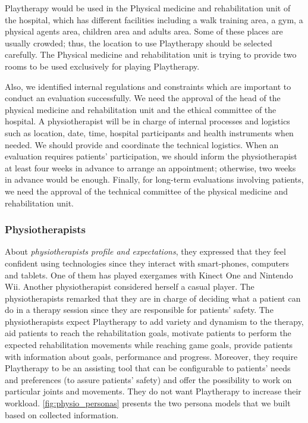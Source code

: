 Playtherapy would be used in the Physical medicine and rehabilitation unit of the hospital, which has different facilities including a walk training area, a gym, a physical agents area, children area and adults area. Some of these places are usually crowded; thus, the location to use Playtherapy should be selected carefully. The Physical medicine and rehabilitation unit is trying to provide two rooms to be used exclusively for playing Playtherapy.

Also, we identified internal regulations and constraints which are important to conduct an evaluation successfully. We need the approval of the head of the physical medicine and rehabilitation unit and the ethical committee of the hospital. A physiotherapist will be in charge of internal processes and logistics such as location, date, time, hospital participants and health instruments when needed. We should provide and coordinate the technical logistics. When an evaluation requires patients' participation, we should inform the physiotherapist at least four weeks in advance to arrange an appointment; otherwise, two weeks in advance would be enough. Finally, for long-term evaluations involving patients, we need the approval of the technical committee of the physical medicine and rehabilitation unit.

\subsubsection{Physiotherapists}
About \emph{physiotherapists profile and expectations}, they expressed that they feel confident using technologies since they interact with smart-phones, computers and tablets. One of them has played exergames with Kinect One and Nintendo Wii. Another physiotherapist considered herself a casual player. The physiotherapists remarked that they are in charge of deciding what a patient can do in a therapy session since they are responsible for patients' safety. The physiotherapists expect Playtherapy to add variety and dynamism to the therapy, aid patients to reach the rehabilitation goals, motivate patients to perform the expected rehabilitation movements while reaching game goals, provide patients with information about goals, performance and progress. Moreover, they require Playtherapy to be an assisting tool that can be configurable to patients' needs and preferences (to assure patients' safety) and offer the possibility to work on particular joints and movements. They do not want Playtherapy to increase their workload. \autoref{fig:physio_personas} presents the two persona models that we built based on collected information.


